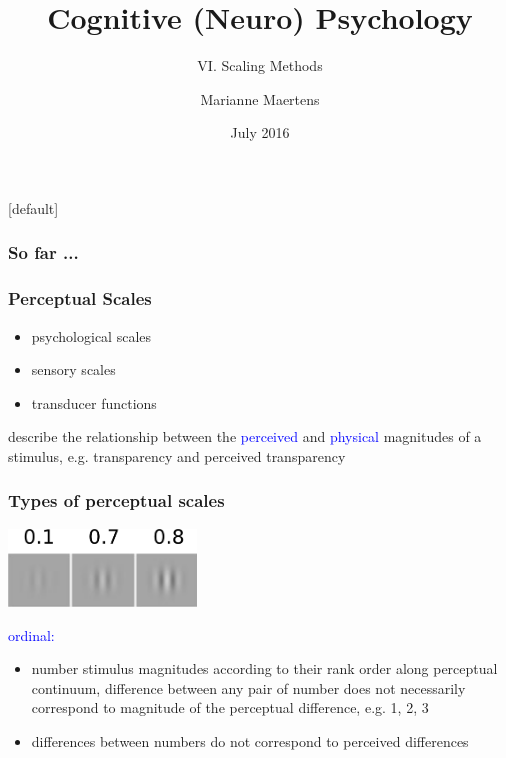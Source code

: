 \documentclass[]{beamer}
\title{ Cognitive (Neuro) Psychology }
\subtitle{VI. Scaling Methods}
\author{ Marianne Maertens }
\institute[TU Berlin]{Technische Universit\"at Berlin}
\date{July 2016}
\begin{document}
[default]

\frame{\titlepage}


\begin{frame}
 \frametitle{So far ...}

\end{frame}


\begin{frame}
 \frametitle{Perceptual Scales}
 \begin{itemize}
  \item psychological scales
  \item sensory scales
  \item transducer functions
 \end{itemize}

describe the relationship between the \textcolor{blue}{perceived} and \textcolor{blue}{physical} magnitudes of a stimulus, e.g. transparency and perceived transparency
\end{frame}


\begin{frame}
 \frametitle{Types of perceptual scales}
\begin{center}
\includegraphics[width=50mm]{figs/l6/three_contrasts.png} 
\end{center}

\textcolor{blue}{ordinal:}
\begin{itemize}
 \item  number stimulus magnitudes according to their rank order along perceptual continuum, difference between any pair of number does not necessarily correspond to magnitude of the perceptual difference, e.g. 1, 2, 3 
 \item differences between numbers do not correspond to perceived differences
\end{itemize}
\end{frame}
\end{document}
